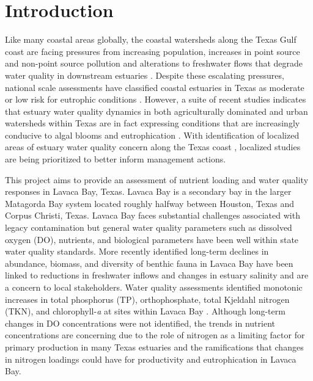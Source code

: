 \documentclass[sn-basic,referee,lineno,pdflatex]{sn-jnl}
\begin{document}



\maketitle

\hypertarget{sec1}{%
\section{Introduction}\label{sec1}}

Like many coastal areas globally, the coastal watersheds along the Texas
Gulf coast are facing pressures from increasing population, increases in
point source and non-point source pollution and alterations to
freshwater flows that degrade water quality in downstream estuaries
\citep{bricker_effects_2008, kennicuttWaterQualityGulf2017, bugica_water_2020}.
Despite these escalating pressures, national scale assessments have
classified coastal estuaries in Texas as moderate or low risk for
eutrophic conditions \citep{bricker_effects_2008}. However, a suite of
recent studies indicates that estuary water quality dynamics in both
agriculturally dominated and urban watersheds within Texas are in fact
expressing conditions that are increasingly conducive to algal blooms
and eutrophication
\citep{wetzWaterQualityDynamics2016, wetz_exceptionally_2017, bugica_water_2020, chinPhytoplanktonBiomassCommunity2022}.
With identification of localized areas of estuary water quality concern
along the Texas coast \citep{bugica_water_2020}, localized studies are
being prioritized to better inform management actions.

This project aims to provide an assessment of nutrient loading and water
quality responses in Lavaca Bay, Texas. Lavaca Bay is a secondary bay in
the larger Matagorda Bay system located roughly halfway between Houston,
Texas and Corpus Christi, Texas. Lavaca Bay faces substantial challenges
associated with legacy contamination but general water quality
parameters such as dissolved oxygen (DO), nutrients, and biological
parameters have been well within state water quality standards. More
recently identified long-term declines in abundance, biomass, and
diversity of benthic fauna in Lavaca Bay have been linked to reductions
in freshwater inflows and changes in estuary salinity
\citep{beserespollackLongtermTrendsResponse2011, palmerImpactsDroughtsLow2015, montagnaAssessmentRelationshipFreshwater2020}
and are a concern to local stakeholders. Water quality assessments
identified monotonic increases in total phosphorus (TP), orthophosphate,
total Kjeldahl nitrogen (TKN), and chlorophyll-\emph{a} at sites within
Lavaca Bay \citep{bugica_water_2020}. Although long-term changes in DO
concentrations were not identified, the trends in nutrient
concentrations are concerning due to the role of nitrogen as a limiting
factor for primary production in many Texas estuaries
\citep{gardnerNitrogenFixationDissimilatory2006, houTransformationFateNitrate2012, doradoUnderstandingInteractionsFreshwater2015, paudelRelationshipSuspendedSolids2019, wetz_exceptionally_2017}
and the ramifications that changes in nitrogen loadings could have for
productivity and eutrophication in Lavaca Bay.
\end{document}

